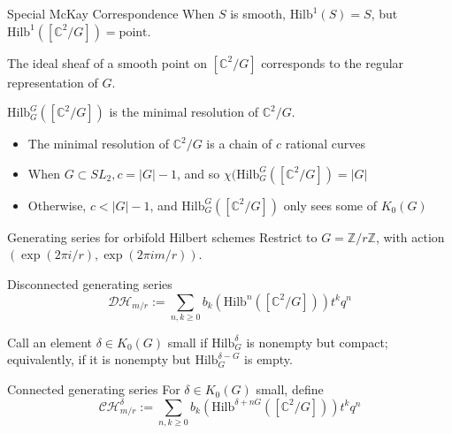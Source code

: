 \documentclass{beamer}
\newcommand{\Hilb}{\textrm{Hilb}}
\newcommand{\C}{\mathbb{C}}
\newcommand{\Z}{\mathbb{Z}}
\begin{document}
\begin{frame}{Special McKay Correspondence}
When $S$ is smooth, $\Hilb^1(S)=S$,  but $\Hilb^1([\C^2/G])=\textrm{point}$.

The ideal sheaf of a smooth point on $[\C^2/G]$ corresponds to the regular representation of $G$.

\begin{theorem}
$\Hilb_G^G([\C^2/G])$ is the minimal resolution of $\C^2/G$.
\end{theorem}

\begin{itemize}
\item The minimal resolution of $\C^2/G$ is a chain of $c$ rational curves
\item When $G\subset SL_2, c=|G|-1$, and so $\chi(\Hilb_G^G([\C^2/G])=|G|$
\item Otherwise, $c<|G|-1$, and $\Hilb_G^G([\C^2/G])$ only sees some of $K_0(G)$
\end{itemize}










\end{frame}


\begin{frame}{Generating series for orbifold Hilbert schemes}
Restrict to $G=\Z/r\Z$, with action $(\exp(2\pi i /r),\exp(2\pi i m/r))$.
\begin{block}{Disconnected generating series}
$$\mathcal{DH}_{m/r}:=\sum_{n,k\geq 0 } b_k(\Hilb^n([\C^2/G])) t^kq^n$$
\end{block}
Call an element $\delta\in K_0(G)$ small if $\Hilb^\delta_G$ is nonempty but compact; equivalently, if it is nonempty but $\Hilb^{\delta-G}_G$ is empty.

\begin{block}{Connected generating series}
For $\delta\in K_0(G)$ small, define 
$$\mathcal{CH}^\delta_{m/r}:=\sum_{n,k\geq 0} b_k(\Hilb^{\delta+nG}([\C^2/G]))t^kq^n$$
\end{block}
\end{frame}
\end{document}

